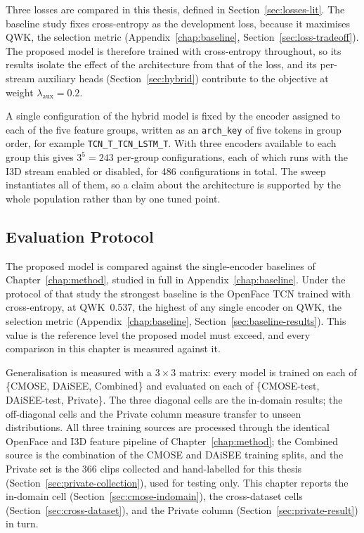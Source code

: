 \documentclass[../main.tex]{subfiles}
\begin{document}
Three losses are compared in this thesis, defined in Section~\ref{sec:losses-lit}. The baseline study fixes cross-entropy as the development loss, because it maximises QWK, the selection metric (Appendix~\ref{chap:baseline}, Section~\ref{sec:loss-tradeoff}). The proposed model is therefore trained with cross-entropy throughout, so its results isolate the effect of the architecture from that of the loss, and its per-stream auxiliary heads (Section~\ref{sec:hybrid}) contribute to the objective at weight $\lambda_{\text{aux}}=0.2$.

A single configuration of the hybrid model is fixed by the encoder assigned to each of the five feature groups, written as an \texttt{arch\_key} of five tokens in group order, for example \texttt{TCN\_T\_TCN\_LSTM\_T}. With three encoders available to each group this gives $3^{5}=243$ per-group configurations, each of which runs with the I3D stream enabled or disabled, for 486 configurations in total. The sweep instantiates all of them, so a claim about the architecture is supported by the whole population rather than by one tuned point.

\subsection{Evaluation Protocol}
\label{sec:eval}

The proposed model is compared against the single-encoder baselines of Chapter~\ref{chap:method}, studied in full in Appendix~\ref{chap:baseline}. Under the protocol of that study the strongest baseline is the OpenFace TCN trained with cross-entropy, at QWK~0.537, the highest of any single encoder on QWK, the selection metric (Appendix~\ref{chap:baseline}, Section~\ref{sec:baseline-results}). This value is the reference level the proposed model must exceed, and every comparison in this chapter is measured against it.

Generalisation is measured with a $3\times3$ matrix: every model is trained on each of \{CMOSE, DAiSEE, Combined\} and evaluated on each of \{CMOSE-test, DAiSEE-test, Private\}. The three diagonal cells are the in-domain results; the off-diagonal cells and the Private column measure transfer to unseen distributions. All three training sources are processed through the identical OpenFace and I3D feature pipeline of Chapter~\ref{chap:method}; the Combined source is the combination of the CMOSE and DAiSEE training splits, and the Private set is the 366 clips collected and hand-labelled for this thesis (Section~\ref{sec:private-collection}), used for testing only. This chapter reports the in-domain cell (Section~\ref{sec:cmose-indomain}), the cross-dataset cells (Section~\ref{sec:cross-dataset}), and the Private column (Section~\ref{sec:private-result}) in turn.
\end{document}
